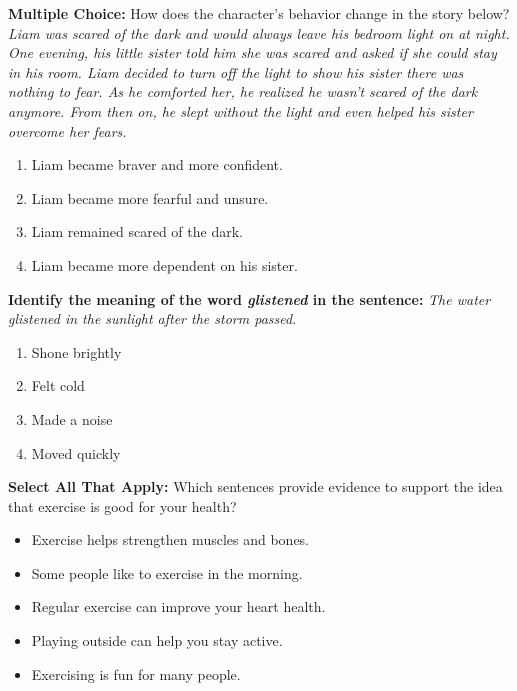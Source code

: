 \documentclass[12pt]{article}
\begin{document}
\begin{tcolorbox}[colframe=black!50, colback=white, title=Question 3]
\textbf{Multiple Choice:} How does the character’s behavior change in the story below?  
\textit{Liam was scared of the dark and would always leave his bedroom light on at night. One evening, his little sister told him she was scared and asked if she could stay in his room. Liam decided to turn off the light to show his sister there was nothing to fear. As he comforted her, he realized he wasn’t scared of the dark anymore. From then on, he slept without the light and even helped his sister overcome her fears.}

\begin{enumerate}[label=(\Alph*)]
\item Liam became braver and more confident.
\item Liam became more fearful and unsure.
\item Liam remained scared of the dark.
\item Liam became more dependent on his sister.
\end{enumerate}
\end{tcolorbox}

\begin{tcolorbox}[colframe=black!50, colback=white, title=Question 4]
\textbf{Identify the meaning of the word \textit{glistened} in the sentence:}  
\textit{The water glistened in the sunlight after the storm passed.}  
\begin{enumerate}[label=(\Alph*)]
\item Shone brightly
\item Felt cold
\item Made a noise
\item Moved quickly
\end{enumerate}
\end{tcolorbox}

\begin{tcolorbox}[colframe=black!50, colback=white, title=Question 5]
\textbf{Select All That Apply:} Which sentences provide evidence to support the idea that exercise is good for your health?  
\begin{itemize}
\item Exercise helps strengthen muscles and bones.
\item Some people like to exercise in the morning.
\item Regular exercise can improve your heart health.
\item Playing outside can help you stay active.
\item Exercising is fun for many people.
\end{itemize}
\end{tcolorbox}
\end{document}
